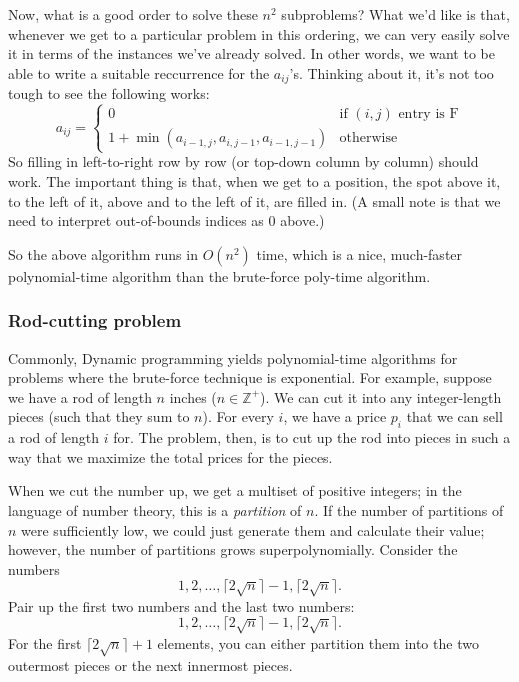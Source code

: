 \documentclass{article}
\newcommand{\Z}{\mathbb{Z}}
\begin{document}
Now, what is a good order to solve these $n^2$ subproblems?
What we'd like is that, whenever we get to a particular problem
in this ordering, we can very easily solve it in terms of the instances
we've already solved.
In other words, we want to be able to write a suitable reccurrence for
the $a_{ij}$'s.
Thinking about it, it's not too tough to see the following works:
\begin{equation}
a_{ij} = 
\left\{
\begin{array}{ll}
0 & \textrm{if } (i,j) \textrm{ entry is F}
\\
1 + \min(a_{i-1,j}, a_{i,j-1}, a_{i-1,j-1}) & \textrm{otherwise}
\end{array}
\right.
\end{equation}
So filling in left-to-right row by row (or top-down column by column) should
work.
The important thing is that, when we get to a position, 
the spot above it, to the left of it, above and to the left of it, are
filled in.
(A small note is that we need to interpret out-of-bounds indices as 0 above.)

So the above algorithm runs in $O(n^2)$ time, which is a nice,
much-faster polynomial-time algorithm than the brute-force poly-time algorithm.

\subsubsection{Rod-cutting problem}

Commonly, Dynamic programming yields polynomial-time algorithms for
problems where the brute-force technique is exponential.
For example, suppose we have a rod of length $n$ inches ($n\in \Z^+$).
We can cut it into any integer-length pieces (such that they sum to $n$).
For every $i$, we have a price $p_i$ that we can sell a rod of length $i$
for.
The problem, then, is to cut up the rod into pieces in such a way that
we maximize the total prices for the pieces.

When we cut the number up, we get a multiset of positive integers; in
the language of number theory, this is a \emph{partition} of $n$.
If the number of partitions of $n$ were sufficiently low, we could just
generate them and calculate their value; however, the number of partitions
grows superpolynomially.
Consider the numbers
$$
1,2,\ldots, \lceil 2\sqrt n \rceil - 1,
\lceil 2\sqrt n \rceil.
$$
Pair up the first two numbers and the last two numbers:
$$
1,2,\ldots, \lceil 2\sqrt n \rceil - 1,
\lceil 2\sqrt n \rceil.
$$
For the first $\lceil 2\sqrt n\rceil + 1$ elements, you can either
partition them into the two outermost pieces or the next
innermost pieces.
\end{document}
